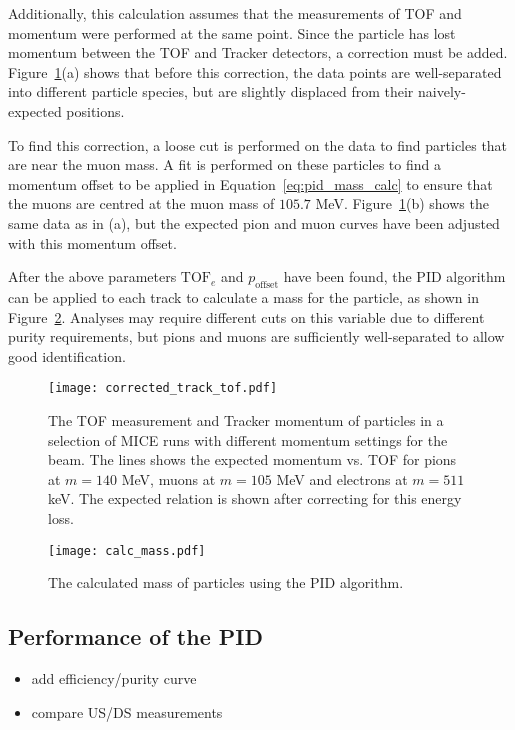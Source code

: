 Additionally, this calculation assumes that the measurements of TOF and momentum were performed at the same point.  Since the particle has lost momentum between the TOF and Tracker detectors, a correction must be added.  Figure~\ref{fig:tof_track}(a) shows that before this correction, the data points are well-separated into different particle species, but are slightly displaced from their naively-expected positions.

To find this correction, a loose cut is performed on the data to find particles that are near the muon mass.  A fit is performed on these particles to find a momentum offset to be applied in Equation~\ref{eq:pid_mass_calc} to ensure that the muons are centred at the muon mass of $105.7$ MeV.  Figure~\ref{fig:tof_track}(b) shows the same data as in (a), but the expected pion and muon curves have been adjusted with this momentum offset.

After the above parameters $\mathrm{TOF}_e$ and $p_\mathrm{offset}$ have been found, the PID algorithm can be applied to each track to calculate a mass for the particle, as shown in Figure~\ref{fig:pid_mass}.  Analyses may require different cuts on this variable due to different purity requirements, but pions and muons are sufficiently well-separated to allow good identification.

\begin{figure}[!ht]
\begin{center}
\texttt{[image: corrected\_track\_tof.pdf]}
\end{center}
\caption{The TOF measurement and Tracker momentum of particles in a selection of MICE runs with different momentum settings for the beam. The lines shows the expected momentum vs. TOF for pions at $m=140$ MeV, muons at $m=105$ MeV and electrons at $m=511$ keV. The expected relation is shown after correcting for this energy loss.}
\label{fig:tof_track}
\end{figure}

\begin{figure}[!ht]
\begin{center}
\texttt{[image: calc\_mass.pdf]}
\end{center}
\caption{The calculated mass of particles using the PID algorithm.}
\label{fig:pid_mass}
\end{figure}


\subsection{Performance of the PID}
\label{SubSect:PID_Performance}
{\color{red}
\begin{itemize}
\item add efficiency/purity curve
\item compare US/DS measurements
\end{itemize}
}


